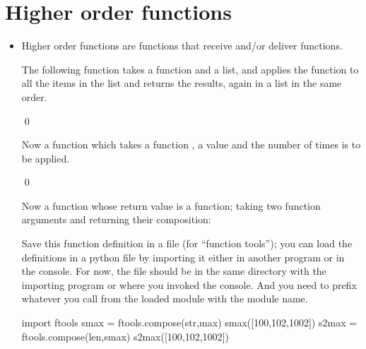 \documentclass[a4paper]{article}
\begin{document}
{\section{Higher order functions}

\begin{itemize}
\item Higher order functions are functions that receive and/or deliver
functions.  

\begin{uexample}
The following function takes a function and a list, and applies the
function to all the items in the list and returns the results, again in a list
in the same order.

\begin{ucodeframe}
\end{ucodeframe}

\qed
\end{uexample}

\begin{uexample}
Now a function which takes a function , a value  and the number   of
times  is to be applied.    
\begin{ucodeframe}
\end{ucodeframe}

\qed
\end{uexample}

\begin{uexample}
Now a function whose return value is a function; taking two function arguments
and returning their composition:

\begin{ucodeframe}
\end{ucodeframe}

Save this function definition in a file  (for ``function
tools''); you can load the definitions in a python file by importing it either
in another program or in the console. For now, the file should be in the same
directory with the importing program or where you invoked the console. And you
need to prefix whatever you call from the loaded module with the module name. 


\begin{ucodeframe}

\begin{pyconsole}
import ftools
smax = ftools.compose(str,max)
smax([100,102,1002])
s2max = ftools.compose(len,smax)
s2max([100,102,1002])
\end{pyconsole}
\end{ucodeframe}


\end{uexample}
\end{itemize}}
\end{document}
